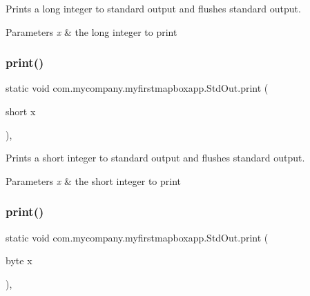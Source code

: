 Prints a long integer to standard output and flushes standard output.


\begin{DoxyParams}{Parameters}
{\em x} & the long integer to print \\
\hline
\end{DoxyParams}
\mbox{\label{classcom_1_1mycompany_1_1myfirstmapboxapp_1_1_std_out_ac02193dbe968144eafac24e687a28600}} 
\subsubsection{\texorpdfstring{print()}{print()}\hspace{0.1cm}{\footnotesize\ttfamily [9/10]}}
{\footnotesize\ttfamily static void com.\+mycompany.\+myfirstmapboxapp.\+Std\+Out.\+print (\begin{DoxyParamCaption}\item[{short}]{x }\end{DoxyParamCaption})\hspace{0.3cm}{\ttfamily [inline]}, {\ttfamily [static]}}

Prints a short integer to standard output and flushes standard output.


\begin{DoxyParams}{Parameters}
{\em x} & the short integer to print \\
\hline
\end{DoxyParams}
\mbox{\label{classcom_1_1mycompany_1_1myfirstmapboxapp_1_1_std_out_a3c3ae9bfc3b3c105f9fc166c17b080ee}} 
\subsubsection{\texorpdfstring{print()}{print()}\hspace{0.1cm}{\footnotesize\ttfamily [10/10]}}
{\footnotesize\ttfamily static void com.\+mycompany.\+myfirstmapboxapp.\+Std\+Out.\+print (\begin{DoxyParamCaption}\item[{byte}]{x }\end{DoxyParamCaption})\hspace{0.3cm}{\ttfamily [inline]}, {\ttfamily [static]}}

